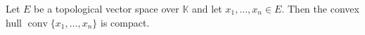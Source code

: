 Let $E$ be a topological vector space over $\mathbb{K}$ and let $x_1, \ldots, x_n \in E$. Then the convex hull $\operatorname{conv}\{x_1, \ldots, x_n\}$ is compact.
